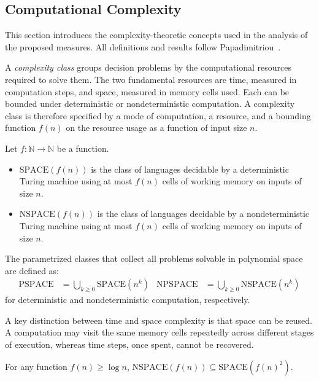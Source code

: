 \subsection{Computational Complexity}
\label{sec:foundations_complexity}

This section introduces the complexity-theoretic concepts used in the analysis of the proposed measures. All definitions and results follow Papadimitriou~\cite{Papadimitriou1994}.

A \emph{complexity class} groups decision problems by the computational resources required to solve them. The two fundamental resources are time, measured in computation steps, and space, measured in memory cells used. Each can be bounded under deterministic or nondeterministic computation. A complexity class is therefore specified by a mode of computation, a resource, and a bounding function $f(n)$ on the resource usage as a function of input size $n$.

\begin{defn}
    \label{defn:space_classes}
    Let $f : \mathbb{N} \to \mathbb{N}$ be a function.
    \begin{itemize}
        \item $\text{SPACE}(f(n))$ is the class of languages decidable by a deterministic Turing machine using at most $f(n)$ cells of working memory on inputs of size $n$.
        \item $\text{NSPACE}(f(n))$ is the class of languages decidable by a nondeterministic Turing machine using at most $f(n)$ cells of working memory on inputs of size $n$.
    \end{itemize}
    The parametrized classes that collect all problems solvable in polynomial space are defined as:
    \begin{align*}
        \text{PSPACE}  & = \bigcup_{k \geq 0} \text{SPACE}(n^k)  &
        \text{NPSPACE} & = \bigcup_{k \geq 0} \text{NSPACE}(n^k)
    \end{align*}
    for deterministic and nondeterministic computation, respectively.
\end{defn}

A key distinction between time and space complexity is that space can be reused. A computation may visit the same memory cells repeatedly across different stages of execution, whereas time steps, once spent, cannot be recovered.

\begin{thm}
    \label{thm:savitch}
    For any function $f(n) \geq \log n$, $\text{NSPACE}(f(n)) \subseteq \text{SPACE}(f(n)^2)$.
\end{thm}

